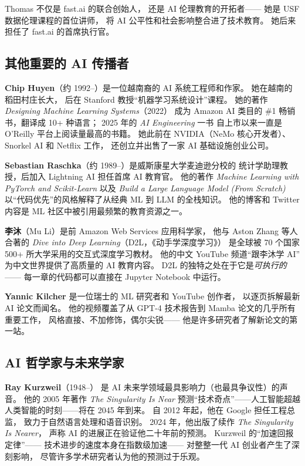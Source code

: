 Thomas 不仅是 fast.ai 的联合创始人，
还是 AI 伦理教育的开拓者——
她是 USF 数据伦理课程的首位讲师，
将 AI 公平性和社会影响整合进了技术教育。
她后来担任了 fast.ai 的首席执行官。

\subsection{其他重要的 AI 传播者}

\textbf{Chip Huyen}（约 1992--）是一位越南裔的 AI 系统工程师和作家。
她在越南的稻田村庄长大，
后在 Stanford 教授``机器学习系统设计''课程。
她的著作 \emph{Designing Machine Learning Systems}（2022）
成为 Amazon AI 类目的 \#1 畅销书，翻译成 10+ 种语言；
2025 年的 \emph{AI Engineering} 一书
自上市以来一直是 O'Reilly 平台上阅读量最高的书籍。
她此前在 NVIDIA（NeMo 核心开发者）、Snorkel AI 和 Netflix 工作，
还创立并出售了一家 AI 基础设施创业公司。

\textbf{Sebastian Raschka}（约 1989--）是威斯康星大学麦迪逊分校的
统计学助理教授，后加入 Lightning AI 担任首席 AI 教育官。
他的著作 \emph{Machine Learning with PyTorch and Scikit-Learn}
以及 \emph{Build a Large Language Model (From Scratch)}
以``代码优先''的风格解释了从经典 ML 到 LLM 的全栈知识。
他的博客和 Twitter 内容是 ML 社区中被引用最频繁的教育资源之一。

\textbf{李沐}（Mu Li）是前 Amazon Web Services 应用科学家，
他与 Aston Zhang 等人合著的
\emph{Dive into Deep Learning}（D2L，《动手学深度学习》）
是全球被 70 个国家 500+ 所大学采用的交互式深度学习教材。
他的中文 YouTube 频道``跟李沐学 AI''
为中文世界提供了高质量的 AI 教育内容。
D2L 的独特之处在于它是\emph{可执行的}——
每一章的代码都可以直接在 Jupyter Notebook 中运行。

\textbf{Yannic Kilcher} 是一位瑞士的 ML 研究者和 YouTube 创作者，
以逐页拆解最新 AI 论文而闻名。
他的视频覆盖了从 GPT-4 技术报告到 Mamba 论文的几乎所有重要工作，
风格直接、不加修饰，偶尔尖锐——
他是许多研究者了解新论文的第一站。

\subsection{AI 哲学家与未来学家}

\textbf{Ray Kurzweil}（1948--）
是 AI 未来学领域最具影响力（也最具争议性）的声音。
他的 2005 年著作 \emph{The Singularity Is Near}
预测``技术奇点''——人工智能超越人类智能的时刻——将在 2045 年到来。
自 2012 年起，他在 Google 担任工程总监，
致力于自然语言处理和语音识别。
2024 年，他出版了续作 \emph{The Singularity Is Nearer}，
声称 AI 的进展正在验证他二十年前的预测。
Kurzweil 的``加速回报定律''——
技术进步的速度本身在指数级加速——
对整整一代 AI 创业者产生了深刻影响，
尽管许多学术研究者认为他的预测过于乐观。

